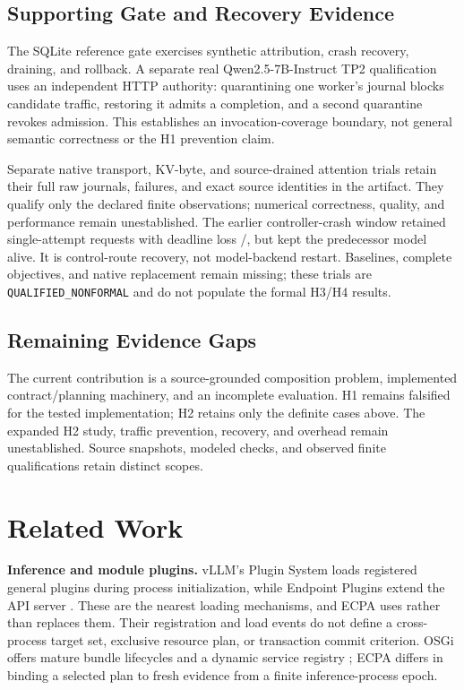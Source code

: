 \documentclass[letterpaper,twocolumn,10pt]{article}
\newcommand{\code}[1]{\texttt{#1}}
\begin{document}
\subsection{Supporting Gate and Recovery Evidence}
The SQLite reference gate exercises synthetic attribution, crash recovery,
draining, and rollback. A separate real Qwen2.5-7B-Instruct TP2 qualification
uses an independent HTTP authority: quarantining one worker's journal blocks
candidate traffic, restoring it admits a completion, and a second quarantine
revokes admission. This establishes an invocation-coverage boundary, not
general semantic correctness or the H1 prevention claim.

Separate native transport, KV-byte, and source-drained attention trials retain
their full raw journals, failures, and exact source identities in the artifact.
They qualify only the declared finite observations; numerical correctness,
quality, and performance remain unestablished. The earlier controller-crash
window retained \ECPAHThreeWindowRequests{} single-attempt requests with
deadline loss \ECPAHThreeWindowDeadlineLoss{}/\ECPAHThreeWindowRequests{},
but kept the predecessor model alive. It is control-route recovery, not
model-backend restart. Baselines, complete objectives, and native replacement
remain missing; these trials are \code{QUALIFIED\_NONFORMAL} and do not
populate the formal H3/H4 results.

\subsection{Remaining Evidence Gaps}
The current contribution is a source-grounded composition problem,
implemented contract/planning machinery, and an incomplete evaluation.
H1 remains falsified for the tested implementation; H2 retains only the
\ECPAHTwoScoredCases{} definite cases above. The expanded H2 study, traffic
prevention, recovery, and overhead remain unestablished. Source snapshots,
modeled checks, and observed finite qualifications retain distinct scopes.

\section{Related Work}
\textbf{Inference and module plugins.}  vLLM's Plugin System loads registered
general plugins during process initialization, while Endpoint Plugins extend
the API server \cite{vllm-plugin,vllm-endpoint}.  These are the nearest loading
mechanisms, and ECPA uses rather than replaces them.  Their registration and
load events do not define a cross-process target set, exclusive resource plan,
or transaction commit criterion.  OSGi offers mature bundle lifecycles and a
dynamic service registry \cite{osgi-core}; ECPA differs in binding a selected
plan to fresh evidence from a finite inference-process epoch.
\end{document}
